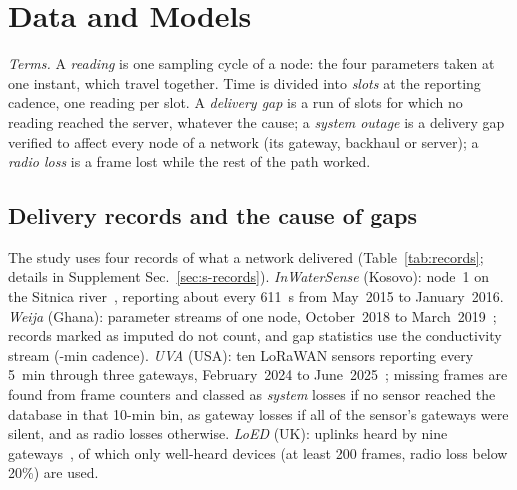 \section{Data and Models}
\label{sec:data}

\emph{Terms.} A \emph{reading} is one sampling cycle of a node: the four parameters taken at one instant, which travel together. Time is divided into \emph{slots} at the reporting cadence, one reading per slot. A \emph{delivery gap} is a run of slots for which no reading reached the server, whatever the cause; a \emph{system outage} is a delivery gap verified to affect every node of a network (its gateway, backhaul or server); a \emph{radio loss} is a frame lost while the rest of the path worked.

\subsection{Delivery records and the cause of gaps}
\label{sec:data-records}
The study uses four records of what a network delivered (Table~\ref{tab:records}; details in Supplement Sec.~\ref{sec:s-records}). \emph{InWaterSense} (Kosovo): node~1 on the Sitnica river~\cite{ahmedi2022dataset,ahmedi2021inwatersense}, reporting about every 611~s from May~2015 to January~2016. \emph{Weija} (Ghana): \weijaStreams{} parameter streams of one node, October~2018 to March~2019~\cite{adumanu2020smart}; records marked as imputed do not count, and gap statistics use the conductivity stream (\weijaCondStepMin-min cadence). \emph{UVA} (USA): ten LoRaWAN sensors reporting every 5~min through three gateways, February~2024 to June~2025~\cite{nikseresht2025uva,nikseresht2025uvadata}; missing frames are found from frame counters and classed as \emph{system} losses if no sensor reached the database in that 10-min bin, as gateway losses if all of the sensor's gateways were silent, and as radio losses otherwise. \emph{LoED} (UK): uplinks heard by nine gateways~\cite{bhatia2020loed,bhatia2020loeddata}, of which only well-heard devices (at least 200 frames, radio loss below 20\%) are used.

